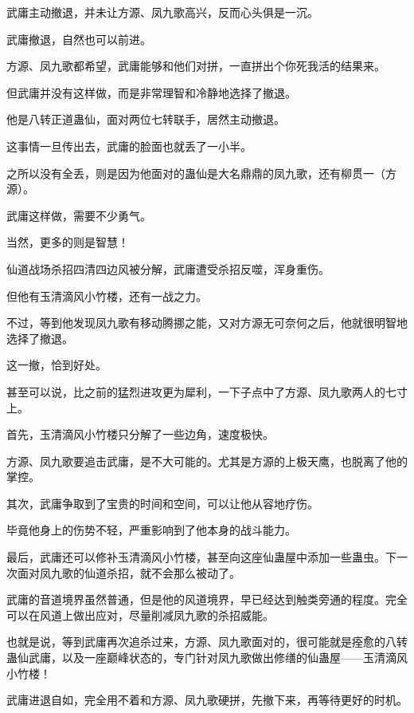 
\begin{this_body}



武庸主动撤退，并未让方源、凤九歌高兴，反而心头俱是一沉。

武庸撤退，自然也可以前进。

方源、凤九歌都希望，武庸能够和他们对拼，一直拼出个你死我活的结果来。

但武庸并没有这样做，而是非常理智和冷静地选择了撤退。

他是八转正道蛊仙，面对两位七转联手，居然主动撤退。

这事情一旦传出去，武庸的脸面也就丢了一小半。

之所以没有全丢，则是因为他面对的蛊仙是大名鼎鼎的凤九歌，还有柳贯一（方源）。

武庸这样做，需要不少勇气。

当然，更多的则是智慧！

仙道战场杀招四清四边风被分解，武庸遭受杀招反噬，浑身重伤。

但他有玉清滴风小竹楼，还有一战之力。

不过，等到他发现凤九歌有移动腾挪之能，又对方源无可奈何之后，他就很明智地选择了撤退。

这一撤，恰到好处。

甚至可以说，比之前的猛烈进攻更为犀利，一下子点中了方源、凤九歌两人的七寸上。

首先，玉清滴风小竹楼只分解了一些边角，速度极快。

方源、凤九歌要追击武庸，是不大可能的。尤其是方源的上极天鹰，也脱离了他的掌控。

其次，武庸争取到了宝贵的时间和空间，可以让他从容地疗伤。

毕竟他身上的伤势不轻，严重影响到了他本身的战斗能力。

最后，武庸还可以修补玉清滴风小竹楼，甚至向这座仙蛊屋中添加一些蛊虫。下一次面对凤九歌的仙道杀招，就不会那么被动了。

武庸的音道境界虽然普通，但是他的风道境界，早已经达到触类旁通的程度。完全可以在风道上做出应对，尽量削减凤九歌的杀招威能。

也就是说，等到武庸再次追杀过来，方源、凤九歌面对的，很可能就是痊愈的八转蛊仙武庸，以及一座巅峰状态的，专门针对凤九歌做出修缮的仙蛊屋——玉清滴风小竹楼！

武庸进退自如，完全用不着和方源、凤九歌硬拼，先撤下来，再等待更好的时机。


\end{this_body}
